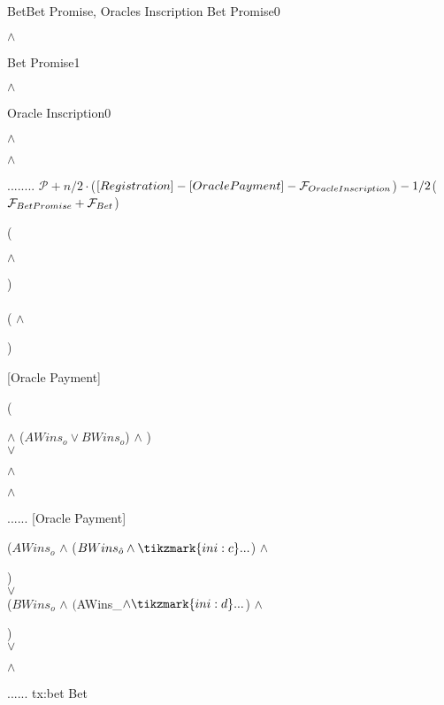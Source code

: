 \transaction
    {Bet}{Bet Promise, Oracles Inscription}
    {Bet Promise}{0}{\signature{A} $\wedge$ \signature{B}}
    {Bet Promise}{1}{\signature{A} $\wedge$ \signature{B}}
    {Oracle Inscription}{0}
    {\signature{A} $\wedge$ \signature{B} $\wedge$ \signature{O}}
            {...}{..}{...}
    \stopinputs
    {$\mathcal{P} + n/2 \cdot $($[Registration] \\
    - [Oracle Payment] \\
    - \mathcal{F}_{Oracle Inscription}$)$ \\
    - 1/2 $($\mathcal{F}_{Bet Promise} + \mathcal{F}_{Bet}$)}
    {(\signature{A} $\wedge$ \signature{B}) \\
                                                   \vee \\
                                                  ( $\wedge$ \signature{B}) }
    {[Oracle Payment]}{(\signature{o} $\wedge$ ($AWins_o \vee BWins_o$) %
                       $\wedge$ ) \\
                       $\vee$  \\
                       \signature{A} $\wedge$ \signature{B} $\wedge$ %
                       }
    {...}{...}
    {[Oracle Payment]}{($AWins_o$ $\wedge$ ($BWins_{\hat{o}} \wedge %
                        \tikzmark{ini:c}...$) $\wedge$ \signature{B}) \\
                       $\vee$ \\
                       ($BWins_o$ $\wedge$ $($AWins_{}$ %
                        \wedge \tikzmark{ini:d} ...$) $\wedge$ \signature{A}) \\
                       $\vee$ \\
                        \signature{o} $\wedge$ }
    {...}{...}
    \stopoutputs
    {tx:bet}
    {Bet}


